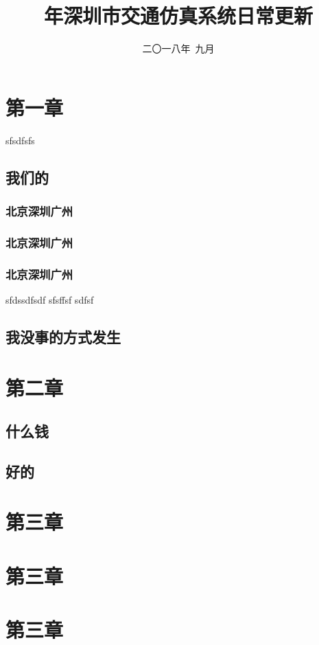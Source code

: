 \documentclass{bookthemeMono}
\title{\cyear 年深圳市交通仿真系统日常更新}
\date{二〇一八年\ 九月}
\begin{document}
\maketitle

\frontmatter

\tableofcontents

\mainmatter
\chapter{第一章}
sfsdfsfs
\section{我们的}
\subsection{北京深圳广州}
\subsection{北京深圳广州}
\subsection{北京深圳广州}
sfdssdfsdf
sfsffsf
\newpage
sdfsf\\
\clearpage
\section{我没事的方式发生}
\chapter{第二章}
\section{什么钱}
\section{好的}
\chapter{第三章}
\chapter{第三章}
\chapter{第三章}
\end{document}
